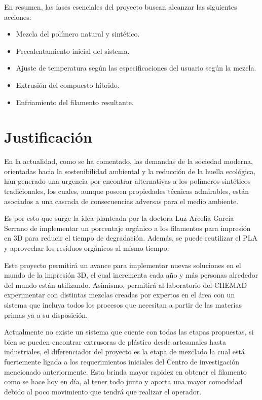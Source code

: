 \documentclass[14pt,oneside]{extarticle} %
\begin{document}
En resumen, las fases esenciales del proyecto buscan alcanzar las siguientes acciones:

\begin{itemize}
    \item Mezcla del polímero natural y sintético.
    \item Precalentamiento inicial del sistema.
    \item Ajuste de temperatura según las especificaciones del usuario según la mezcla.
    \item Extrusión del compuesto híbrido.
    \item Enfriamiento del filamento resultante.
\end{itemize}


\section{Justificación}

En la actualidad, como se ha comentado, las demandas de la sociedad moderna, orientadas hacia la sostenibilidad ambiental y la reducción de la huella ecológica, han generado una urgencia por encontrar alternativas a los polímeros sintéticos tradicionales, los cuales, aunque poseen propiedades técnicas admirables, están asociados a una cascada de consecuencias adversas para el medio ambiente. 

Es por esto que surge la idea planteada por la doctora Luz Arcelia García Serrano de implementar un porcentaje orgánico a los filamentos para impresión en 3D para reducir el tiempo de degradación. Además, se puede reutilizar el PLA y aprovechar los residuos orgánicos al mismo tiempo.

Este proyecto permitirá un avance para implementar nuevas soluciones en el mundo de la impresión 3D, el cual incrementa cada año y más personas alrededor del mundo están utilizando. Asimismo, permitirá al laboratorio del CIIEMAD experimentar con distintas mezclas creadas por expertos en el área con un sistema que incluya todos los procesos que necesitan a partir de las materias primas ya a su disposición.

Actualmente no existe un sistema que cuente con todas las etapas propuestas, si bien se pueden encontrar extrusoras de plástico desde artesanales hasta industriales, el diferenciador del proyecto es la etapa de mezclado la cual está fuertemente ligada a los requerimientos iniciales del Centro de investigación mencionado anteriormente. Esta brinda mayor rapidez en obtener el filamento como se hace hoy en día, al tener todo junto y aporta una mayor comodidad debido al poco movimiento que tendrá que realizar el operador.
\end{document}
